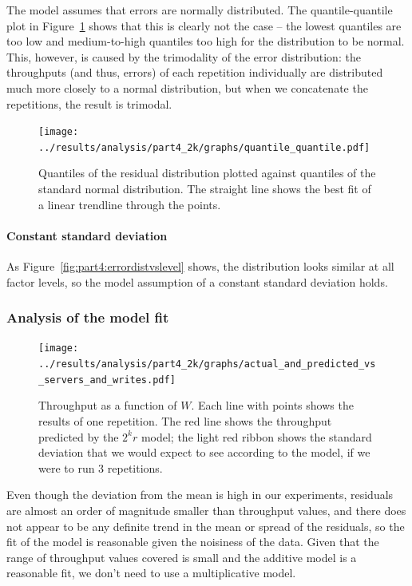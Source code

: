 \documentclass[11pt]{article}
\begin{document}
The model assumes that errors are normally distributed. The quantile-quantile plot in Figure~\ref{fig:part4:quantile_quantile} shows that this is clearly not the case -- the lowest quantiles are too low and medium-to-high quantiles too high for the distribution to be normal. This, however, is caused by the trimodality of the error distribution: the throughputs (and thus, errors) of each repetition individually are distributed much more closely to a normal distribution, but when we concatenate the repetitions, the result is trimodal.

\begin{figure}
\centering
\texttt{[image: ../results/analysis/part4\_2k/graphs/quantile\_quantile.pdf]}
\caption{Quantiles of the residual distribution plotted against quantiles of the standard normal distribution. The straight line shows the best fit of a linear trendline through the points.}
\label{fig:part4:quantile_quantile}
\end{figure}


\paragraph{Constant standard deviation} As Figure~\ref{fig:part4:errordistvslevel} shows, the distribution looks similar at all factor levels, so the model assumption of a constant standard deviation holds.


\subsubsection{Analysis of the model fit}

\begin{figure}[h]
\centering
\texttt{[image: ../results/analysis/part4\_2k/graphs/actual\_and\_predicted\_vs\_servers\_and\_writes.pdf]}
\caption{Throughput as a function of $W$. Each line with points shows the results of one repetition. The red line shows the throughput predicted by the $2^kr$ model; the light red ribbon shows the standard deviation that we would expect to see according to the model, if we were to run 3 repetitions.}
\label{fig:part4:actual_and_predicted_vs_servers_and_writes}
\end{figure}

Even though the deviation from the mean is high in our experiments, residuals are almost an order of magnitude smaller than throughput values, and there does not appear to be any definite trend in the mean or spread of the residuals, so the fit of the model is reasonable given the noisiness of the data. Given that the range of throughput values covered is small and the additive model is a reasonable fit, we don't need to use a multiplicative model.
\end{document}

